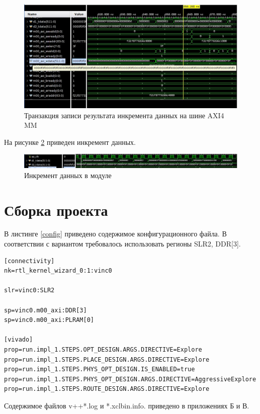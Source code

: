 \begin{figure}[h!p]
	\centering
	\includegraphics[width = \linewidth]{inc/write_var.png}
	\caption{Транзакция записи результата инкремента данных на шине AXI4 MM}
	\label{writeTransVar}
\end{figure}

На рисунке \ref{incTrVar} приведен инкремент данных. 

\begin{figure}[h!p]
	\centering
	\includegraphics[width = \linewidth]{inc/inc_var.png}
	\caption{Инкремент данных в модуле}
	\label{incTrVar}
\end{figure}

\chapter{Сборка проекта}
В листинге \ref{config} приведено содержимое конфигурационного файла. В соответствии с вариантом требовалось использовать регионы SLR2, DDR[3].
\begin{lstlisting}[label=config,caption=Содержимое файла конфигурации.]
[connectivity]
nk=rtl_kernel_wizard_0:1:vinc0

slr=vinc0:SLR2

sp=vinc0.m00_axi:DDR[3]
sp=vinc0.m00_axi:PLRAM[0]

[vivado]
prop=run.impl_1.STEPS.OPT_DESIGN.ARGS.DIRECTIVE=Explore
prop=run.impl_1.STEPS.PLACE_DESIGN.ARGS.DIRECTIVE=Explore
prop=run.impl_1.STEPS.PHYS_OPT_DESIGN.IS_ENABLED=true
prop=run.impl_1.STEPS.PHYS_OPT_DESIGN.ARGS.DIRECTIVE=AggressiveExplore
prop=run.impl_1.STEPS.ROUTE_DESIGN.ARGS.DIRECTIVE=Explore
\end{lstlisting}

Содержимое файлов v++*.log и *.xclbin.info. приведено в приложениях Б и В.

